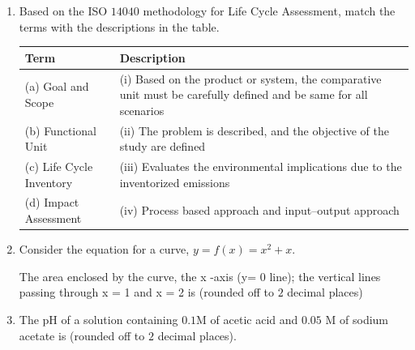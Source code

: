 \documentclass[journal]{IEEEtran}
\numberwithin{equation}{enumi}
\numberwithin{figure}{enumi}
\begin{document}
\begin{enumerate}[start=1, label={Q\arabic*.}]
\item Based on the ISO $14040$ methodology for Life Cycle Assessment, match the terms with
the descriptions in the table. 

\begin{center}
\renewcommand{\arraystretch}{1.3}
\setlength{\tabcolsep}{6pt} 
\begin{tabular}{|p{3cm}|p{8cm}|}
\hline
\textbf{Term} & \textbf{Description} \\ \hline
(a) Goal and Scope      & (i) Based on the product or system, the comparative unit must be carefully defined and be same for all scenarios \\ \hline
(b) Functional Unit     & (ii) The problem is described, and the objective of the study are defined \\ \hline
(c) Life Cycle \newline Inventory & (iii) Evaluates the environmental implications due to the inventorized emissions \\ \hline
(d) Impact \newline Assessment   & (iv) Process based approach and input--output approach \\ \hline
\end{tabular}
\end{center}
\begin{enumerate}  
\end{enumerate}
\item Consider the equation for a curve, $y = f(x) = x^2 + x$.

\vspace{0.1cm}
The area enclosed by the curve, the x -axis (y= $0$ line); the vertical lines passing through x = 1 and x = 2 is \underline{\hspace{1.5cm}}(rounded off to $2$ decimal places)

\vspace{0.1cm}

\item The pH of a solution containing $0.1$M of acetic acid and $0.05$ M of sodium acetate is
\underline{\hspace{1.5cm}} (rounded off to $2$ decimal places).


\end{enumerate}
\end{document}
